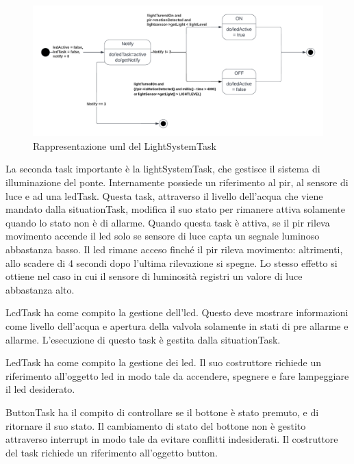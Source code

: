 \documentclass[a4paper,12pt]{report}
\begin{document}
\begin{figure}[H]
    \centering
    \includegraphics[width=13cm]{lightsystem.png}
    \caption{Rappresentazione uml del LightSystemTask}
\end{figure}

\par
La seconda task importante è la lightSystemTask, che gestisce il sistema di illuminazione del ponte. Internamente possiede un riferimento al pir, al sensore di luce e ad una ledTask. Questa task, attraverso il livello dell'acqua che viene mandato dalla situationTask, modifica il suo stato per rimanere attiva solamente quando lo stato non è di allarme. Quando questa task è attiva, se il pir rileva movimento accende il led solo se sensore di luce capta un segnale luminoso abbastanza basso. Il led rimane acceso finché il pir rileva movimento: altrimenti, allo scadere di 4 secondi dopo l'ultima rilevazione si spegne. Lo stesso effetto si ottiene nel caso in cui il sensore di luminosità registri un valore di luce abbastanza alto.
\newline
\par
LcdTask ha come compito la gestione dell'lcd. Questo deve mostrare informazioni come livello dell'acqua e apertura della valvola solamente in stati di pre allarme e allarme. L'esecuzione di questo task è gestita dalla situationTask.
\newline
\par
LedTask ha come compito la gestione dei led. Il suo costruttore richiede un riferimento all'oggetto led in modo tale da accendere, spegnere e fare lampeggiare il led desiderato.
\newline
\par
ButtonTask ha il compito di controllare se il bottone è stato premuto, e di ritornare il suo stato. Il cambiamento di stato del bottone non è gestito attraverso interrupt in modo tale da evitare conflitti indesiderati. Il costruttore del task richiede un riferimento all'oggetto button.
\end{document}
